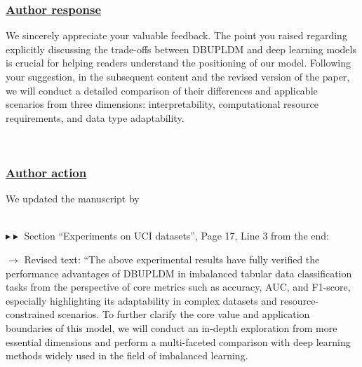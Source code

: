 \documentclass[journal,12pn, onecolumn]{IEEEtran}
\begin{document}
{{{{{{{\subsubsection*{\textbf{\underline{Author response}}}
We sincerely appreciate your valuable feedback. The point you raised regarding explicitly discussing the trade-offs between DBUPLDM and deep learning models is crucial for helping readers understand the positioning of our model. Following your suggestion, in the subsequent content and the revised version of the paper, we will conduct a detailed comparison of their differences and applicable scenarios from three dimensions: interpretability, computational resource requirements, and data type adaptability.
}\\

{\color{black}
\subsubsection*{\textbf{\underline{Author action}}}
We updated the manuscript by
}\\

$\blacktriangleright\blacktriangleright$ Section ``Experiments on UCI datasets'', Page 17,  Line 3 from the end:\\



{\color{orange}$\longrightarrow$ Revised text: ``The above experimental results have fully verified the performance advantages of DBUPLDM in imbalanced tabular data classification tasks from the perspective of core metrics such as accuracy, AUC, and F1-score, especially highlighting its adaptability in complex datasets and resource-constrained scenarios. To further clarify the core value and application boundaries of this model, we will conduct an in-depth exploration from more essential dimensions and perform a multi-faceted comparison with deep learning methods widely used in the field of imbalanced learning.

}}}}}}}
\end{document}

